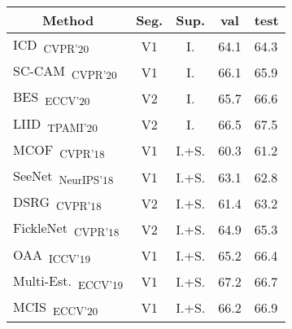 \begin{table}[]
\normalsize
\centering
{\small
\begin{tabular}{@{}lccll@{}}
\toprule
\multicolumn{1}{c}{Method}                                                              & Seg.      & Sup.  & \multicolumn{1}{c}{val} & \multicolumn{1}{c}{test} \\ \midrule
\multicolumn{1}{l}{ICD~\cite{fan2020learning}\textsubscript{CVPR'20}}                   & V1        & I.    & 64.1                    & 64.3                     \\ 
\multicolumn{1}{l}{SC-CAM~\cite{chang2020weakly}\textsubscript{CVPR'20}}                & V1        & I.    & 66.1                    & 65.9                     \\
\multicolumn{1}{l}{BES~\cite{chen2020boundary}\textsubscript{ECCV'20}}                  & V2        & I.    & 65.7                    & 66.6                     \\
\multicolumn{1}{l}{LIID~\cite{liu2020leveraging}\textsubscript{TPAMI'20}}                  & V2        & I.    & 66.5                    & 67.5                     \\
\multicolumn{1}{l}{MCOF~\cite{wang2018weakly}\textsubscript{CVPR'18}}                   & V1        & I.+S. & 60.3                    & 61.2                     \\
\multicolumn{1}{l}{SeeNet~\cite{hou2018self}\textsubscript{NeurIPS'18}}                 & V1        & I.+S. & 63.1                    & 62.8                     \\
\multicolumn{1}{l}{DSRG~\cite{huang2018weakly}\textsubscript{CVPR'18}}                  & V2        & I.+S. & 61.4                    & 63.2                     \\
\multicolumn{1}{l}{FickleNet~\cite{lee2019ficklenet}\textsubscript{CVPR'18}}            & V2        & I.+S. & 64.9                    & 65.3                     \\
\multicolumn{1}{l}{OAA~\cite{jiang2019integral}\textsubscript{ICCV'19}}                 & V1        & I.+S. & 65.2                    & 66.4                     \\
\multicolumn{1}{l}{Multi-Est.~\cite{fan2020employing}\textsubscript{ECCV'19}}           & V1        & I.+S. & 67.2                    & 66.7                     \\
\multicolumn{1}{l}{MCIS~\cite{sun2020mining}\textsubscript{ECCV'20}}                    & V1        & I.+S. & 66.2                    & 66.9                     \\

\end{tabular}}
\end{table}
